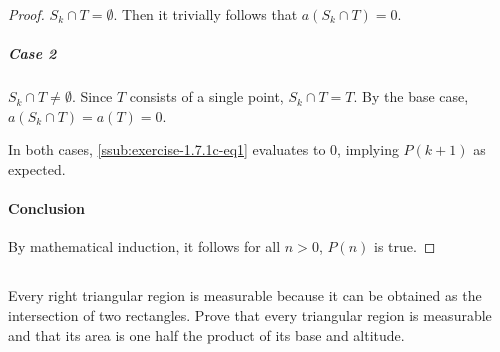 \documentclass{report}
\begin{document}
\begin{proof}
      $S_k \cap T = \emptyset$.
      Then it trivially follows that $a(S_k \cap T) = 0$.

    \subparagraph{Case 2}%

      $S_k \cap T \neq \emptyset$.
      Since $T$ consists of a single point, $S_k \cap T = T$.
      By the base case, $a(S_k \cap T) = a(T) = 0$.

    \vspace{8pt}
    \noindent
    In both cases, \eqref{ssub:exercise-1.7.1c-eq1} evaluates to $0$, implying
      $P(k + 1)$ as expected.

  \paragraph{Conclusion}%

    By mathematical induction, it follows for all $n > 0$, $P(n)$ is true.

\end{proof}

\subsection{}%

  Every right triangular region is measurable because it can be obtained as the
    intersection of two rectangles.
  Prove that every triangular region is measurable and that its area is one half
    the product of its base and altitude.
\end{document}
